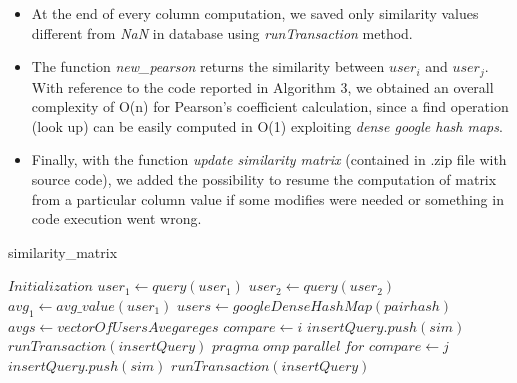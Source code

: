 \begin{itemize}
	\item At the end of every column computation, we saved only similarity values different from \textit{NaN} in database using \textit{runTransaction} method.
	\item The function \textit{new\_pearson} returns the similarity between $user_i$ and $user_j$. With reference to the code reported in Algorithm 3, we obtained an overall complexity of O(n) for Pearson's coefficient calculation, since a find operation (look up) can be easily computed in O(1) exploiting \textit{dense google hash maps}.
	\item Finally, with the function \textit{update similarity matrix} (contained in .zip file with source code), we added the possibility to resume the computation of matrix from a particular column value if some modifies were needed or something in code execution went wrong.
\end{itemize}

\begin{algorithm}
	\caption{similarity\_matrix}
	\begin{algorithmic} 
		\STATE $Initialization$
		\STATE $user_1 \leftarrow query(user_1)$
		\STATE $user_2 \leftarrow query(user_2)$
		\STATE $avg_1 \leftarrow avg\_value(user_1)$
		\STATE $users \leftarrow googleDenseHashMap(pairhash)$
		\STATE $avgs \leftarrow vectorOfUsersAvegareges$
		\vspace{4mm}	
		\STATE $compare \leftarrow i$
		\STATE $insertQuery.push(sim)$
		\ENDIF
		\ENDFOR
		\STATE $runTransaction(insertQuery)$
		\vspace{4mm}
		\STATE $pragma \; omp \; parallel \; for$
		\STATE $compare \leftarrow j$
		\STATE $insertQuery.push(sim)$
		\ENDIF
		\ENDFOR
		\STATE $runTransaction(insertQuery)$
		\ENDFOR
	\end{algorithmic}
\end{algorithm}

